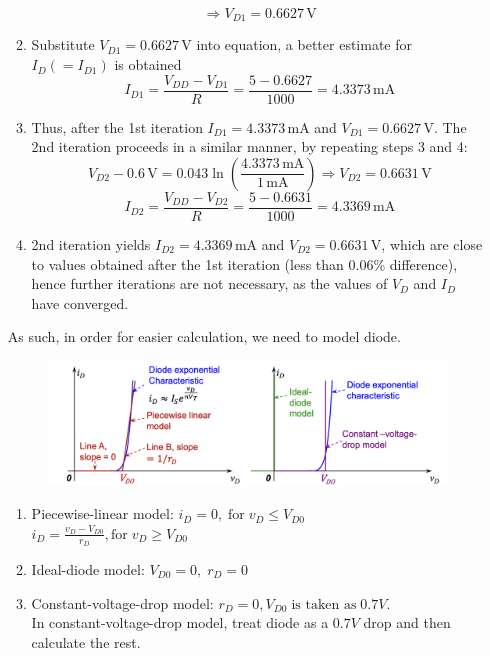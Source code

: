 \documentclass{article}
\begin{document}
\begin{enumerate}
\begin{enumerate}
        \[ \Rightarrow V_{D1} = 0.6627 \, \text{V} \]
        \item Substitute \( V_{D1} = 0.6627 \, \text{V} \) into equation, a better estimate for \( I_D ( = I_{D1} ) \) is obtained
        \[ I_{D1} = \frac{V_{DD} - V_{D1}}{R} = \frac{5 - 0.6627}{1000} = 4.3373 \, \text{mA} \]
        \item Thus, after the 1st iteration \( I_{D1} = 4.3373 \, \text{mA} \) and \( V_{D1} = 0.6627 \, \text{V} \). The 2nd iteration proceeds in a similar manner, by repeating steps 3 and 4:
        \[ V_{D2} - 0.6 \, \text{V} = 0.043 \ln(\frac{4.3373 \, \text{mA}}{1 \, \text{mA}}) \Rightarrow V_{D2} = 0.6631 \, \text{V} \]
        \[ I_{D2} = \frac{V_{DD} - V_{D2}}{R} = \frac{5 - 0.6631}{1000} = 4.3369 \, \text{mA} \]
        \item 2nd iteration yields \( I_{D2} = 4.3369 \, \text{mA} \) and \( V_{D2} = 0.6631 \, \text{V} \), which are close to values obtained after the 1st iteration (less than 0.06\% difference), hence further iterations are not necessary, as the values of \( V_D \) and \( I_D \) have converged.
    \end{enumerate}
    As such, in order for easier calculation, we need to model diode.\\
    \begin{figure}[h]
        \centering
        \includegraphics[width=1\linewidth]{image/largemodeling.png}
    \end{figure}
    \begin{enumerate}
        \item Piecewise-linear model: \(i_D = 0,\; \text{for}\; v_D\leq V_{D0}\) \\
        \(i_D = \frac{v_D - V_{D0}}{r_D}, \text{for} \; v_D \geq V_{D0}\)
        \item Ideal-diode model: \(V_{D0} = 0, \; r_D = 0\)
        \item Constant-voltage-drop model: \(r_D = 0, V_{D0} \; \text{is taken as} \; 0.7V.\) \\
        In constant-voltage-drop model, treat diode as a $0.7V$ drop and then calculate the rest.

\end{enumerate}
\end{enumerate}
\end{document}
